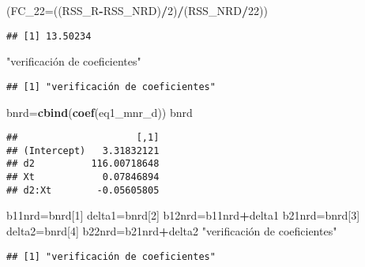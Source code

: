 \documentclass[
]{article}
\newenvironment{Shaded}{\begin{snugshade}}{\end{snugshade}}
\newcommand{\DataTypeTok}[1]{\textcolor[rgb]{0.13,0.29,0.53}{#1}}
\newcommand{\DecValTok}[1]{\textcolor[rgb]{0.00,0.00,0.81}{#1}}
\newcommand{\KeywordTok}[1]{\textcolor[rgb]{0.13,0.29,0.53}{\textbf{#1}}}
\newcommand{\NormalTok}[1]{#1}
\newcommand{\OperatorTok}[1]{\textcolor[rgb]{0.81,0.36,0.00}{\textbf{#1}}}
\newcommand{\StringTok}[1]{\textcolor[rgb]{0.31,0.60,0.02}{#1}}
\begin{document}
\begin{Shaded}
\begin{Highlighting}[]
\NormalTok{(}\DataTypeTok{FC_22=}\NormalTok{((RSS_R}\OperatorTok{-}\NormalTok{RSS_NRD)}\OperatorTok{/}\DecValTok{2}\NormalTok{)}\OperatorTok{/}\NormalTok{(RSS_NRD}\OperatorTok{/}\DecValTok{22}\NormalTok{))}
\end{Highlighting}
\end{Shaded}

\begin{verbatim}
## [1] 13.50234
\end{verbatim}

\begin{Shaded}
\begin{Highlighting}[]
\StringTok{"verificación de coeficientes"}
\end{Highlighting}
\end{Shaded}

\begin{verbatim}
## [1] "verificación de coeficientes"
\end{verbatim}

\begin{Shaded}
\begin{Highlighting}[]
\NormalTok{bnrd=}\KeywordTok{cbind}\NormalTok{(}\KeywordTok{coef}\NormalTok{(eq1_mnr_d))}
\NormalTok{bnrd}
\end{Highlighting}
\end{Shaded}

\begin{verbatim}
##                     [,1]
## (Intercept)   3.31832121
## d2          116.00718648
## Xt            0.07846894
## d2:Xt        -0.05605805
\end{verbatim}

\begin{Shaded}
\begin{Highlighting}[]
\NormalTok{b11nrd=bnrd[}\DecValTok{1}\NormalTok{]}
\NormalTok{delta1=bnrd[}\DecValTok{2}\NormalTok{]}
\NormalTok{b12nrd=b11nrd}\OperatorTok{+}\NormalTok{delta1}
\NormalTok{b21nrd=bnrd[}\DecValTok{3}\NormalTok{]}
\NormalTok{delta2=bnrd[}\DecValTok{4}\NormalTok{]}
\NormalTok{b22nrd=b21nrd}\OperatorTok{+}\NormalTok{delta2}
\StringTok{"verificación de coeficientes"}
\end{Highlighting}
\end{Shaded}

\begin{verbatim}
## [1] "verificación de coeficientes"
\end{verbatim}
\end{document}
